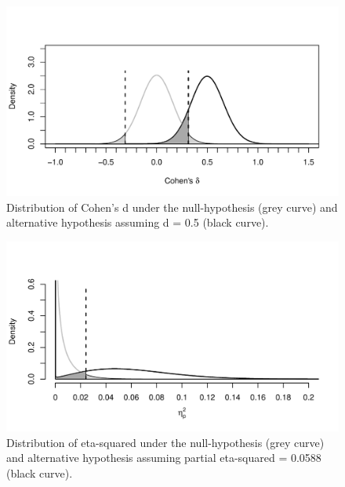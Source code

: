 \documentclass[
  ,jou,floatsintext]{apa6}
\begin{document}
\begin{figure}
\centering
\includegraphics{0.1_Simulation_Based_Power_Analysis_For_Factorial_ANOVA_Designs_files/figure-latex/d-plot-1.pdf}
\caption{\label{fig:d-plot}Distribution of Cohen's d under the null-hypothesis (grey curve) and alternative hypothesis assuming d = 0.5 (black curve).}
\end{figure}

\begin{figure}
\centering
\includegraphics{0.1_Simulation_Based_Power_Analysis_For_Factorial_ANOVA_Designs_files/figure-latex/eta-plot-1.pdf}
\caption{\label{fig:eta-plot}Distribution of eta-squared under the null-hypothesis (grey curve) and alternative hypothesis assuming partial eta-squared = 0.0588 (black curve).}
\end{figure}
\end{document}
